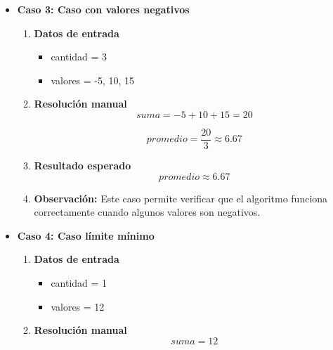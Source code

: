 \documentclass[12pt,twoside]{book}
\begin{document}
\begin{itemize}
\begin{enumerate}
									\item \textbf{Observación:} Este caso permite comprobar que el algoritmo maneja correctamente valores iguales a cero dentro del conjunto de datos.
								\end{enumerate}
							\item \textbf{Caso 3: Caso con valores negativos}
								
								\begin{enumerate}
									\item \textbf{Datos de entrada}
										
										\begin{itemize}
											\item cantidad = 3
											\item valores = -5, 10, 15
										\end{itemize}
									
									\item \textbf{Resolución manual}
										\[
										suma = -5 + 10 + 15 = 20
										\]
										
										\[
										promedio = \frac{20}{3} \approx 6.67
										\]
						
									\item \textbf{Resultado esperado}
										\[
										promedio \approx 6.67
										\]
									\item \textbf{Observación: }Este caso permite verificar que el algoritmo funciona correctamente cuando algunos valores son negativos.
								\end{enumerate}
							\item \textbf{Caso 4: Caso límite mínimo}
								
								\begin{enumerate}
									\item \textbf{Datos de entrada}
										
										\begin{itemize}
											\item cantidad = 1
											\item valores = 12
										\end{itemize}
									
									\item \textbf{Resolución manual}
										\[
										suma = 12
										\]
										

\end{enumerate}
\end{itemize}
\end{document}
